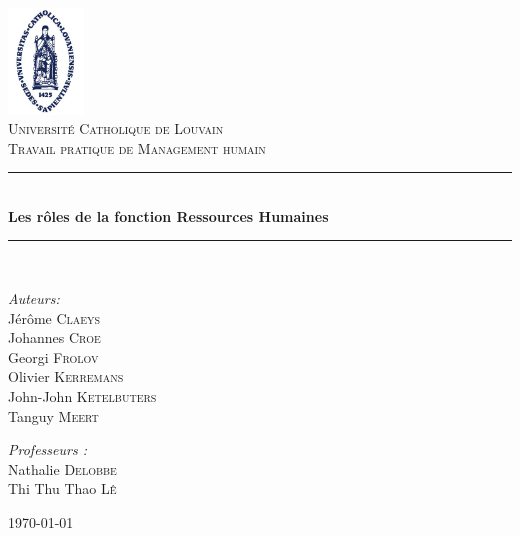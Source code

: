 \documentclass[a4paper, 12pt]{article}
\newcommand{\HRule}{\rule{\linewidth}{0.5mm}}
\begin{document}
\begin{titlepage}
\begin{center}

\includegraphics[width=0.15\textwidth]{./sedes_ucl.png}~\\[1cm]

\textsc{\LARGE Université Catholique de Louvain}\\[1.5cm]

\textsc{\Large Travail pratique de Management humain}\\[0.5cm]

\HRule \\[0.4cm]
{ \huge \bfseries Les rôles de la fonction Ressources Humaines\\[0.4cm] }

\HRule \\[1.5cm]

\noindent
\begin{minipage}[t]{0.4\textwidth}
\begin{flushleft} \large
\emph{Auteurs:}\\
Jérôme \textsc{Claeys} \\
Johannes \textsc{Croe} \\
Georgi \textsc{Frolov} \\
Olivier \textsc{Kerremans} \\
John-John \textsc{Ketelbuters} \\
Tanguy \textsc{Meert}

\end{flushleft}
\end{minipage}%
\begin{minipage}[t]{0.4\textwidth}
\begin{flushright} \large
\emph{Professeurs :} \\
Nathalie \textsc{Delobbe} \\
Thi Thu Thao \textsc{Lê}
\end{flushright}
\end{minipage}

\vfill

{\large \today}

\end{center}
\end{titlepage}
\end{document}
